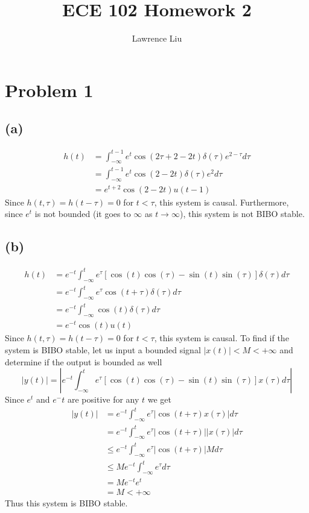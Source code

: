 \documentclass[12pt]{article}
\title{ECE 102 Homework 2}
\author{Lawrence Liu}
\begin{document}
\maketitle
\section*{Problem 1}
\subsection*{(a)}
\begin{align*}
h(t)&=\int_{-\infty}^{t-1}e^t\cos(2\tau+2-2t)\delta(\tau)e^{2-\tau}d\tau\\
&=\int_{-\infty}^{t-1}e^t\cos(2-2t)\delta(\tau)e^{2}d\tau\\
&=e^{t+2}\cos(2-2t)u(t-1)
\end{align*}
Since $h(t,\tau)=h(t-\tau)=0$ for $t<\tau$, this system is causal. Furthermore, since $e^t$ is not bounded (it goes to $\infty$ as $t\to\infty$), this system is not BIBO stable.
\subsection*{(b)}
\begin{align*}
h(t)&=e^{-t}\int_{-\infty}^{t}e^\tau[\cos(t)\cos(\tau)-\sin(t)\sin(\tau)]\delta(\tau)d\tau\\
&=e^{-t}\int_{-\infty}^{t}e^\tau\cos(t+\tau)\delta(\tau)d\tau\\
&=e^{-t}\int_{-\infty}^{t}\cos(t)\delta(\tau)d\tau\\
&=e^{-t}\cos(t)u(t)
\end{align*}
Since $h(t,\tau)=h(t-\tau)=0$ for $t<\tau$, this system is causal. To find if the system is BIBO stable, let us input a bounded signal $|x(t)|<M<+\infty$ and determine if the output is bounded as well
$$
|y(t)|=\left|e^{-t}\int_{-\infty}^{t}e^\tau[\cos(t)\cos(\tau)-\sin(t)\sin(\tau)]x(\tau)d\tau\right|
$$
Since $e^t$ and $e^-t$ are positive for any $t$ we get
\begin{align*}
|y(t)|&=e^{-t}\int_{-\infty}^{t}e^\tau|\cos(t+\tau)x(\tau)|d\tau\\
&=e^{-t}\int_{-\infty}^{t}e^\tau|\cos(t+\tau)||x(\tau)|d\tau\\
&\leq e^{-t}\int_{-\infty}^{t}e^\tau|\cos(t+\tau)|Md\tau\\
&\leq Me^{-t}\int_{-\infty}^{t}e^\tau d\tau\\
&=Me^{-t}e^t\\
&=M<+\infty
\end{align*}
Thus this system is BIBO stable.
\end{document}
